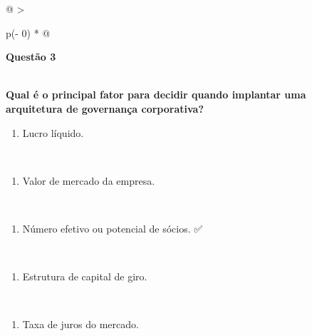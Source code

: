 \documentclass[
]{book}
\providecommand{\tightlist}{%
  \setlength{\itemsep}{0pt}\setlength{\parskip}{0pt}}
\begin{document}
\begin{longtable}[]{@{}
  >{\raggedright\arraybackslash}p{(\columnwidth - 0\tabcolsep) * }@{}}
\toprule\noalign{}
\begin{minipage}[b]{\linewidth}\raggedright
\textbf{Questão 3}
\end{minipage} \\
\midrule\noalign{}
\endhead
\bottomrule\noalign{}
\endlastfoot
\textbf{Qual é o principal fator para decidir quando implantar uma arquitetura de governança corporativa?} \\
\begin{minipage}[t]{\linewidth}\raggedright
\begin{enumerate}
\def\labelenumi{\alph{enumi})}
\tightlist
\item
  Lucro líquido.
\end{enumerate}
\end{minipage} \\
\begin{minipage}[t]{\linewidth}\raggedright
\begin{enumerate}
\def\labelenumi{\alph{enumi})}
\setcounter{enumi}{1}
\tightlist
\item
  Valor de mercado da empresa.
\end{enumerate}
\end{minipage} \\
\begin{minipage}[t]{\linewidth}\raggedright
\begin{enumerate}
\def\labelenumi{\alph{enumi})}
\setcounter{enumi}{2}
\tightlist
\item
  Número efetivo ou potencial de sócios. ✅
\end{enumerate}
\end{minipage} \\
\begin{minipage}[t]{\linewidth}\raggedright
\begin{enumerate}
\def\labelenumi{\alph{enumi})}
\setcounter{enumi}{3}
\tightlist
\item
  Estrutura de capital de giro.
\end{enumerate}
\end{minipage} \\
\begin{minipage}[t]{\linewidth}\raggedright
\begin{enumerate}
\def\labelenumi{\alph{enumi})}
\setcounter{enumi}{4}
\tightlist
\item
  Taxa de juros do mercado.
\end{enumerate}
\end{minipage} \\
\end{longtable}
\end{document}
